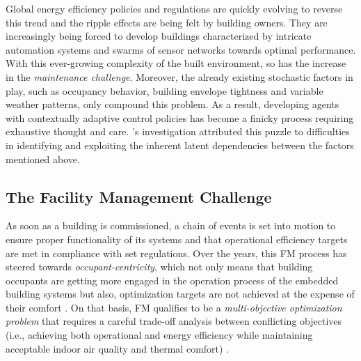 Global energy efficiency policies and regulations are quickly evolving to reverse this trend \citep{Zhou2020Energy-efficientWaves, Viguie2020EarlyParis, InternationalEnergyAgencyIEA2023EnergyVersailles} and the ripple effects are being felt by building owners. They are increasingly being forced to develop buildings characterized by intricate automation systems and swarms of sensor networks towards optimal performance. With this ever-growing complexity of the built environment, so has the increase in the \textit{maintenance challenge}. Moreover, the already existing stochastic factors in play, such as occupancy behavior, building envelope tightness and variable weather patterns, only compound this problem. As a result, developing agents with contextually adaptive control policies has become a finicky process requiring exhaustive thought and care. \cite{Curry2012}'s investigation attributed this puzzle to difficulties in identifying and exploiting the inherent latent dependencies between the factors mentioned above.
 
\subsection{The Facility Management Challenge}
As soon as a building is commissioned, a chain of events is set into motion to ensure proper functionality of its systems and that operational efficiency targets are met in compliance with set regulations. Over the years, this \ac{FM} process has steered towards \textit{occupant-centricity}, which not only means that building occupants are getting more engaged in the operation process of the embedded building systems but also, optimization targets are not achieved at the expense of their comfort \citep{Park2018ComprehensiveReview, Park2019AControls, Park2019LightLearn:Learning, OBrien2020AnStandards, Park2022TowardHubs, Jia2023Occupant3.0, Deng2023Learning-BasedWorkplaces}. On that basis, \ac{FM} qualifies to be a \textit{multi-objective optimization problem} that requires a careful trade-off analysis between conflicting objectives (i.e., achieving both operational and energy efficiency while maintaining acceptable indoor air quality and thermal comfort) \citep{Toffolo2002, Delgarm2016, Shaikh2018, Yong2020Multi-objectiveParameters, Wang2023AnPerspectives}. 


